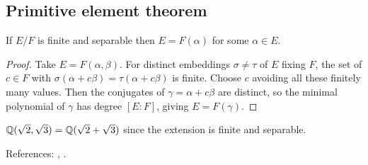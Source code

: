 \subsection{Primitive element theorem}
\begin{theorem}\label{thm:PET}
If $E/F$ is finite and separable then $E=F(\alpha)$ for some $\alpha\in E$.
\end{theorem}
\begin{proof}
Take $E=F(\alpha,\beta)$. For distinct embeddings $\sigma\ne\tau$ of $E$ fixing
$F$, the set of $c\in F$ with $\sigma(\alpha+c\beta)=\tau(\alpha+c\beta)$ is
finite. Choose $c$ avoiding all these finitely many values. Then the conjugates
of $\gamma=\alpha+c\beta$ are distinct, so the minimal polynomial of $\gamma$ has
degree $[E\!:\!F]$, giving $E=F(\gamma)$.
\end{proof}
\begin{example}
$\mathbb{Q}(\sqrt2,\sqrt3)=\mathbb{Q}(\sqrt2+\sqrt3)$ since the extension is finite and separable.
\end{example}
References: \cite[\S14]{DF}, \cite[Ch.~VI]{Artin}.
